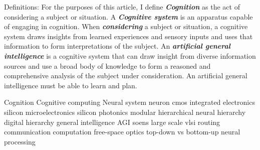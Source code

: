 Definitions: For the purposes of this article, I define \textbf{\textit{Cognition}} as the act of considering a subject or situation. A \textbf{\textit{Cognitive system}} is an apparatus capable of engaging in cognition. When \textbf{\textit{considering}} a subject or situation, a cognitive system draws insights from learned experiences and sensory inputs and uses that information to form interpretations of the subject. An \textbf{\textit{artificial general intelligence}} is a cognitive system that can draw insight from diverse information sources and use a broad body of knowledge to form a reasoned and comprehensive analysis of the subject under consideration. An artificial general intelligence must be able to learn and plan.

\vspace{3em}
Cognition
Cognitive computing
Neural system
neuron
cmos
integrated electronics
silicon microelectronics
silicon photonics
modular 
hierarchical
neural hierarchy
digital hierarchy
general intelligence
AGI
soens
large scale
vlsi
routing
communication
computation
free-space optics
top-down vs bottom-up neural processing




